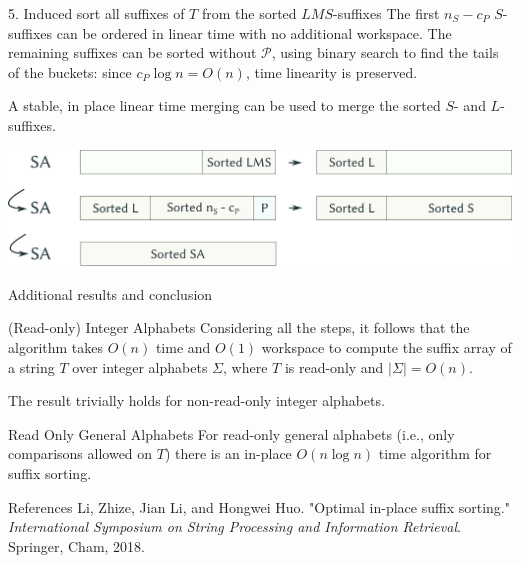 \documentclass{beamer}
\begin{document}
  \begin{frame}{5. Induced sort all suffixes of $T$ from the sorted $LMS$-suffixes}
    The first $n_S - c_P$ $S$-suffixes can be ordered in linear time with no additional workspace. The remaining suffixes can be sorted without $\mathcal{P}$, using binary search to find the tails of the buckets: since $c_P \log n = O(n)$, time linearity is preserved.

    A stable, in place linear time merging can be used to merge the sorted $S$- and $L$-suffixes.
    \begin{center}
      \includegraphics[width=1\textwidth]{img/SA_sorted.pdf}
    \end{center}
  \end{frame}


  \begin{frame}{Additional results and conclusion}
    \begin{block}{(Read-only) Integer Alphabets}
      \vspace{1pt}
      Considering all the steps, it follows that the algorithm takes $O(n)$ time and $O(1)$ workspace to compute the suffix array of a string $T$ over integer alphabets $\Sigma$, where $T$ is read-only and $|\Sigma| = O(n)$.
    \end{block}

    The result trivially holds for non-read-only integer alphabets.

    \pause

    \begin{block}{Read Only General Alphabets}
      \vspace{1pt}
      For read-only general alphabets (i.e., only comparisons allowed on $T$) there is an in-place $O(n\log n)$ time algorithm for suffix sorting.
    \end{block}

    \pause

    \begin{block}{References}
      \vspace{1pt}
      Li, Zhize, Jian Li, and Hongwei Huo. "Optimal in-place suffix sorting." \textit{International Symposium on String Processing and Information Retrieval}. Springer, Cham, 2018.
    \end{block}

  \end{frame}
\end{document}

